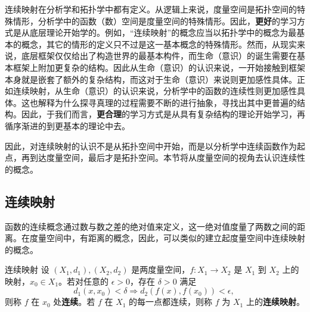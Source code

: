 
连续映射在分析学和拓扑学中都有定义。从逻辑上来说，度量空间是拓扑空间的特殊情形，分析学中的函数（数）空间是度量空间的特殊情形。因此，\textbf{更好}的学习方式是从底层理论开始学的。例如，“连续映射”的概念应当以拓扑学中的概念为最基本的概念，其它的情形的定义只不过是这一基本概念的特殊情形。然而，从现实来说，底层框架仅仅给出了构造世界的最基本构件，而生命（意识）的诞生需要在基本框架上附加更复杂的结构。因此从生命（意识）的认识来说，一开始接触到框架本身就是嵌套了额外的复杂结构，而这对于生命（意识）来说则更加感性具体。正如连续映射，从生命（意识）的认识来说，分析学中的函数的连续性则更加感性具体。这也解释为什么探寻真理的过程需要不断的进行抽象，寻找出其中更普遍的结构。因此，于我们而言，\textbf{更合理}的学习方式是从具有复杂结构的理论开始学习，再循序渐进的到更基本的理论中去。

因此，对连续映射的认识不是从拓扑空间中开始，而是以分析学中连续函数作为起点，再到达度量空间，最后才是拓扑空间。本节将从度量空间的视角去认识连续性的概念。

\subsection{连续映射}
函数的连续概念通过数与数之差的绝对值来定义，这一绝对值度量了两数之间的距离。在度量空间中，有距离的概念，因此，可以类似的建立起度量空间中连续映射的概念。
\begin{definition}{连续映射}
设 $(X_1,d_1),(X_2,d_2)$ 是两度量空间，$f:X_1\rightarrow X_2$ 是 $X_1$ 到 $X_2$ 上的映射，$x_0\in X_1$。若对任意的 $\epsilon>0$，存在 $\delta>0$ 满足
\begin{equation}
d_1(x,x_0)<\delta \Rightarrow d_2(f(x),f(x_0))<\epsilon,~
\end{equation}
则称 $f$ 在 $x_0$ 处\textbf{连续}。若 $f$ 在 $X_1$ 的每一点都连续，则称 $f$ 为 $X_1$ 上的\textbf{连续映射}。
\end{definition}












